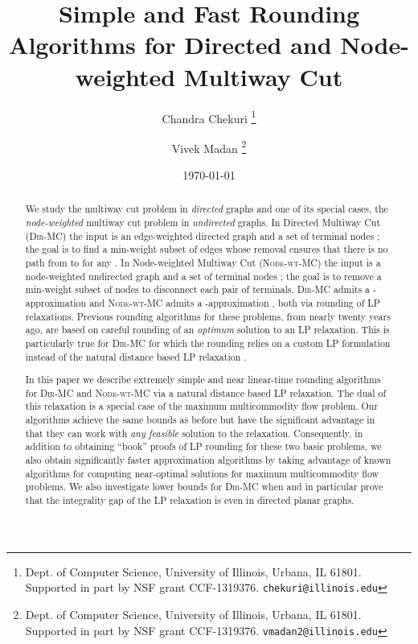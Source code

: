 \documentclass[11pt]{article}
\def\DirMC{\textsc{Dir-MC}\xspace}
\def\NodeMC{\textsc{Node-wt-MC}\xspace}
\def\NodeMC{\textsc{Node-wt-MC}\xspace}
\begin{document}
\title{Simple and Fast Rounding Algorithms for Directed and Node-weighted Multiway Cut}

\author{
Chandra Chekuri
\thanks{
Dept. of Computer Science, University of Illinois, Urbana, IL 61801.
Supported in part by NSF grant CCF-1319376. {\tt chekuri@illinois.edu}}
\and
Vivek Madan
\thanks{
Dept. of Computer Science, University of Illinois, Urbana, IL 61801.
Supported in part by NSF grant CCF-1319376.
{\tt vmadan2@illinois.edu}}
}

\date{\today}

\maketitle

\thispagestyle{empty}
\begin{abstract}
  We study the multiway cut problem in {\em directed} graphs and one
  of its special cases, the {\em node-weighted} multiway cut problem
  in {\em undirected} graphs.  In {\sc Directed Multiway Cut} (\DirMC)
  the input is an edge-weighted directed graph  and a set of
   terminal nodes ; the goal is
  to find a min-weight subset of edges whose removal ensures that there
  is no path from  to  for any . In {\sc
    Node-weighted Multiway Cut} (\NodeMC) the input is a node-weighted
  undirected graph  and a set of  terminal nodes
  ; the goal is to remove a
  min-weight subset of nodes to disconnect each pair of
  terminals. \DirMC admits a -approximation \cite{NaorZ01}
  and \NodeMC admits a -approximation
  \cite{GargVY04}, both via rounding of LP relaxations.
  Previous rounding algorithms for these problems, from nearly twenty
  years ago, are based on careful rounding of an {\em
    optimum} solution to an LP relaxation. This is particularly true
  for \DirMC for which the rounding relies on a custom LP formulation
  instead of the natural distance based LP relaxation \cite{NaorZ01}.

  In this paper we describe extremely simple and near linear-time
  rounding algorithms for \DirMC and \NodeMC via a natural distance
  based LP relaxation. The dual of this relaxation is a special case
  of the maximum  multicommodity flow problem. Our
  algorithms achieve the same bounds as before but have the
  significant advantage in that they can work with {\em any feasible}
  solution to the relaxation. Consequently, in addition to obtaining
  ``book'' proofs of LP rounding for these two basic problems, we also
  obtain significantly faster approximation algorithms by taking
  advantage of known algorithms for computing near-optimal solutions
  for maximum multicommodity flow problems. We also investigate 
  lower bounds for \DirMC when  and in particular prove that
  the integrality gap of the LP relaxation is  even in directed
  planar graphs.
\end{abstract}
\end{document}
